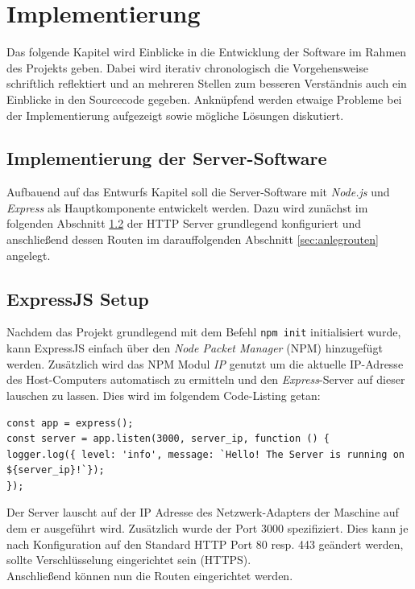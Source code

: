 \section{Implementierung}\label{sec:implementierung}
Das folgende Kapitel wird Einblicke in die Entwicklung der Software im Rahmen des Projekts geben. 
Dabei wird iterativ chronologisch die Vorgehensweise schriftlich reflektiert und an mehreren Stellen 
zum besseren Verständnis auch ein Einblicke in den Sourcecode gegeben. Anknüpfend werden etwaige Probleme bei der Implementierung aufgezeigt sowie mögliche Lösungen diskutiert. 

\subsection{Implementierung der Server-Software}\label{sec:implementserver}
Aufbauend auf das Entwurfs Kapitel soll die Server-Software mit \emph{Node.js} und \emph{Express} als Hauptkomponente entwickelt werden. Dazu wird zunächst im folgenden Abschnitt \ref{sec:implementexpress} der HTTP Server grundlegend konfiguriert und anschließend dessen Routen im darauffolgenden Abschnitt \ref{sec:anlegrouten} angelegt. 

\subsection{ExpressJS Setup}\label{sec:implementexpress}
Nachdem das Projekt grundlegend mit dem Befehl \texttt{npm init} initialisiert wurde,
kann ExpressJS einfach über den \emph{Node Packet Manager} (NPM) hinzugefügt werden. 
Zusätzlich wird das NPM Modul \emph{IP} genutzt um die aktuelle IP-Adresse des Host-Computers automatisch zu ermitteln und
den \emph{Express}-Server auf dieser lauschen zu lassen. Dies wird im folgendem Code-Listing getan:
\begin{lstlisting}[caption=Errichtung des Webservers]
const app = express();
const server = app.listen(3000, server_ip, function () {
logger.log({ level: 'info', message: `Hello! The Server is running on ${server_ip}!`});
});
\end{lstlisting}
Der Server lauscht auf der IP Adresse des Netzwerk-Adapters der Maschine auf dem er ausgeführt wird. Zusätzlich wurde der Port 3000 spezifiziert. Dies kann je nach Konfiguration auf den Standard HTTP Port 80 resp. 443 geändert werden, sollte Verschlüsselung eingerichtet sein (HTTPS).
\\
Anschließend können nun die Routen eingerichtet werden.


